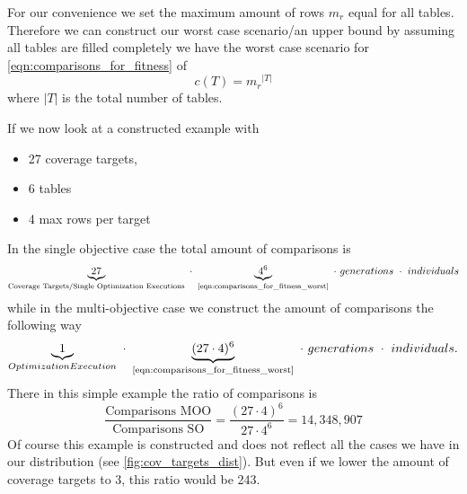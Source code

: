 For our convenience we set the maximum amount of rows $m_r$ equal for all tables. Therefore we can construct our worst case scenario/an upper bound by assuming all tables are filled completely we have the worst case scenario for \cref{eqn:comparisons_for_fitness} of 
\begin{equation}
	\label{eqn:comparisons_for_fitness_worst}
	c(T) = {m_r}^{|T|}
\end{equation} 
where $|T|$ is the total number of tables.

If we now look at a constructed example with
\begin{itemize}
	\item 27 coverage targets,
	\item 6 tables
	\item 4 max rows per target
\end{itemize}

In the single objective case the total amount of comparisons is
\begin{equation}
	\underbrace{27}_{\textrm{Coverage Targets/Single Optimization Executions}} ~\cdot~ \underbrace{4^6}_{\textrm{\Cref{eqn:comparisons_for_fitness_worst}}} ~\cdot~ generations ~\cdot~ individuals
\end{equation}
while in the multi-objective case we construct the amount of comparisons the following way
\begin{equation}
	\underbrace{1}_{Optimization Execution} ~\cdot~ \underbrace{(27 \cdot 4)^6}_{\textrm{\Cref{eqn:comparisons_for_fitness_worst}}} ~\cdot~ generations ~\cdot~ individuals.
\end{equation}
There in this simple example the ratio of comparisons is
\begin{equation}
	\label{eqn:theoretical_ratio_row_comparisons}
	\frac{\textrm{Comparisons MOO}}{\textrm{Comparisons SO}} = \frac{(27 \cdot 4)^6}{27 \cdot 4^6} = 14,348,907
\end{equation}
Of course this example is constructed and does not reflect all the cases we have in our distribution (see \cref{fig:cov_targets_dist}). But even if we lower the amount of coverage targets to 3, this ratio would be 243.

